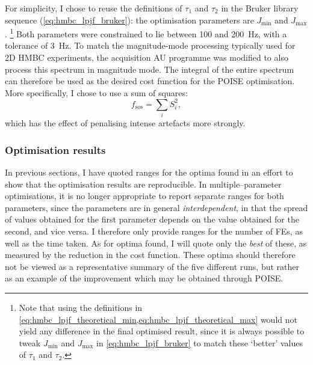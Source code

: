 For simplicity, I chose to reuse the definitions of $\tau_1$ and $\tau_2$ in the Bruker library sequence (\cref{eq:hmbc_lpjf_bruker}): the optimisation parameters are $J_\text{min}$ and $J_\text{max}$.%
\footnote{Note that using the definitions in \cref{eq:hmbc_lpjf_theoretical_min,eq:hmbc_lpjf_theoretical_max} would not yield any difference in the final optimised result, since it is always possible to tweak $J_\text{min}$ and $J_\text{max}$ in \cref{eq:hmbc_lpjf_bruker} to match these `better' values of $\tau_1$ and $\tau_2$.}
Both parameters were constrained to lie between 100 and \qty{200}{\Hz}, with a tolerance of \qty{3}{\Hz}.
To match the magnitude-mode processing typically used for 2D HMBC experiments, the acquisition AU programme was modified to also process this spectrum in magnitude mode.
The integral of the entire spectrum can therefore be used as the desired cost function for the POISE optimisation.
More specifically, I chose to use a sum of squares:
\begin{equation}
    \label{eq:sos_cost_function}
    f_\text{sos} = \sum_i S_i^2,
\end{equation}
which has the effect of penalising intense artefacts more strongly.


\subsubsection{Optimisation results}

In previous sections, I have quoted ranges for the optima found in an effort to show that the optimisation results are reproducible.
In multiple--parameter optimisations, it is no longer appropriate to report separate ranges for both parameters, since the parameters are in general \textit{interdependent}, in that the spread of values obtained for the first parameter depends on the value obtained for the second, and vice versa.
I therefore only provide ranges for the number of FEs, as well as the time taken.
As for optima found, I will quote only the \textit{best} of these, as measured by the reduction in the cost function.
These optima should therefore not be viewed as a representative summary of the five different runs, but rather as an example of the improvement which may be obtained through POISE.

